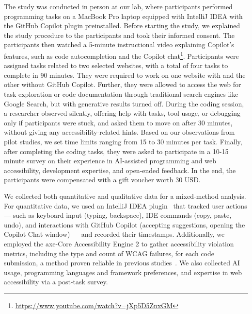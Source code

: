 The study was conducted in person at our lab, where participants performed programming tasks on a MacBook Pro laptop equipped with IntelliJ IDEA with the GitHub Copilot plugin preinstalled. Before starting the study, we explained the study procedure to the participants and took their informed consent. The participants then watched a 5-minute instructional video explaining Copilot's features, such as code autocompletion and the Copilot chat\footnote{\url{https://www.youtube.com/watch?v=jXp5D5ZnxGM}}. Participants were assigned tasks related to two selected websites, with a total of four tasks to complete in 90 minutes. They were required to work on one website with and the other without GitHub Copilot. Further, they were allowed to access the web for task exploration or code documentation through traditional search engines like Google Search, but with generative results turned off. During the coding session, a researcher observed silently, offering help with tasks, tool usage, or debugging only if participants were stuck, and asked them to move on after 30 minutes, without giving any accessibility-related hints. Based on our observations from pilot studies, we set time limits ranging from 15 to 30 minutes per task. Finally, after completing the coding tasks, they were asked to participate in a 10-15 minute survey on their experience in AI-assisted programming and web accessibility, development expertise, and open-ended feedback. In the end, the participants were compensated with a gift voucher worth 30 USD.



We collected both quantitative and qualitative data for a mixed-method analysis.
For quantitative data, we used an IntelliJ IDEA plugin~\cite{dkandalov_activity_tracker} that tracked user actions --- such as keyboard input (typing, backspace), IDE commands (copy, paste, undo), and interactions with GitHub Copilot (accepting suggestions, opening the Copilot Chat window) --- and recorded their timestamps. 
Additionally, we employed the axe-Core Accessibility Engine 2 to gather accessibility violation metrics, including the type and count of WCAG failures, for each code submission, a method proven reliable in previous studies~\cite{p2023towards}. We also collected AI usage, programming languages and framework preferences, and expertise in web accessibility via a post-task survey.

